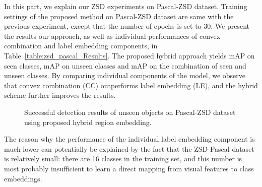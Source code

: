 In this part, we explain our ZSD experiments on Pascal-ZSD dataset. Training settings of the proposed method on
Pascal-ZSD dataset are same with the previous experiment, except that the number of epochs is set to 30. 
We present the results our approach, as well as individual performances of convex combination and label embedding components,
in Table~\ref{table:zsd_pascal_Results}. The proposed hybrid approach yields  mAP on seen
classes,  mAP on unseen classes and  mAP on the combination of 
seen and unseen classes. By comparing individual components of the model, we observe that 
convex combination (CC) outperforms label embedding (LE), and the hybrid scheme further improves the results.

\vspace{4mm}

\begin{figure}
\caption{Successful detection results of unseen objects on Pascal-ZSD dataset using proposed hybrid region embedding.}
\label{fig:pascal_results}
\end{figure}

The reason why the performance of the individual label embedding component is much lower can potentially be explained by the
fact that the ZSD-Pascal dataset is relatively small: there are 16 classes in the training set, and this number is
most probably insufficient to learn a direct mapping from visual features to class embeddings.

